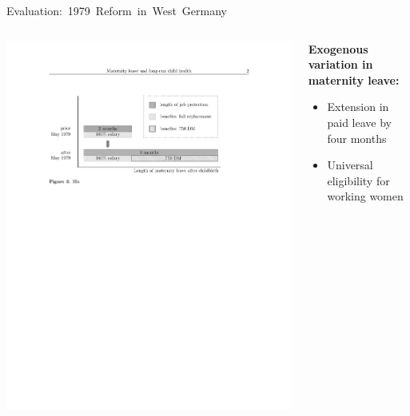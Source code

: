 \documentclass[aspectratio=169,handout]{beamer} %
\begin{document}
\begin{frame}{\mbox{Evaluation: 1979 Reform in West Germany}}



\begin{columns}
	\begin{column}{.6\textwidth}
		\includegraphics[width = \textwidth]{../../analysis/graphs/SOEP/Reform_shortened.pdf}
	\end{column}%
	\begin{column}{.40\textwidth}
		\textbf{Exogenous variation in maternity leave:}\begin{itemize}
		\item Extension in paid leave by four months
		\item Universal eligibility for working women
		
		\end{itemize}
	\end{column}%
	\hfill
	

\end{columns}
\end{frame}
\end{document}
